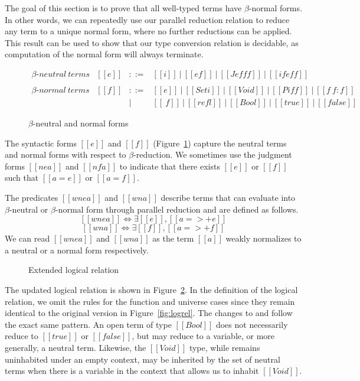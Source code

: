 \documentclass[acmsmall,screen=true,
\ifpublic review=false\else,review=true\fi
  ,anonymous=\ifanonymous true\else false\fi]{acmart}
\begin{document}
The goal of this section is to prove that all well-typed terms have
$\beta$-normal forms. In other words, we can repeatedly use our parallel
reduction relation to reduce any term to a unique normal form, where no
further reductions can be applied. This result can be used to show that our
type conversion relation is decidable, as computation of the normal form will
always terminate.

\begin{figure}[h]
  \[
    \begin{array}{llcl}
       \beta\text{-}\mathit{neutral\ terms} &
      [[e]] & ::= & [[i]]\ |\ [[e f]]\ |\ [[J e f f f]]\ |\ [[if e f
                    f]] \\ \\
      \beta\text{-}\mathit{normal\ terms} &
      [[f]] & ::= & [[e]]\ |\ [[Set i]]\ |\ [[Void]]\ |\ [[Pi f f]]\
                    |\ [[f ~ f : f]]\\
            & & |   & [[\ f]]\ |\ [[refl]]\ |\ [[Bool]]\ |\ [[true]]\ |\ [[false]]
    \end{array}
  \]
  \caption{$\beta$-neutral and normal forms}
  \label{fig:nenf}
\end{figure}

The syntactic forms $[[e]]$ and $[[f]]$ (Figure~\ref{fig:nenf}) capture the
neutral terms and normal forms with respect to $\beta$-reduction. We sometimes
use the judgment forms $[[ne a]]$ and $[[nf a]]$ to indicate that there exists
$[[e]]$ or $[[f]]$ such that $[[a = e]]$ or $[[a = f]]$.

The predicates $[[wne a]]$ and $[[wn
a]]$ describe terms that can evaluate into $\beta$-neutral or
$\beta$-normal form through parallel reduction and are defined as
follows.
\[ [[wne a]] \iff \exists [[e]], [[a =>+ e]] \]
\[ [[wn a]] \iff \exists [[f]], [[a =>+ f]] \]
We can read $[[wne a]]$ and $[[wn a]]$ as the term $[[a]]$ weakly normalizes to a neutral or a normal form respectively.

\begin{figure}[h]
  \caption{Extended logical relation}
  \label{fig:logrelopen}
\end{figure}

The updated logical relation is shown
in Figure~\ref{fig:logrelopen}.
In the definition of the logical relation, we omit the rules for
the function and universe cases since they remain identical to the
original version in Figure~\ref{fig:logrel}.
The changes to  and  follow the exact same pattern.
An open term of type $[[Bool]]$ does
not necessarily reduce to $[[true]]$ or $[[false]]$, but may reduce to
a variable, or more generally, a neutral term. Likewise, the
$[[Void]]$ type, while remains uninhabited under an empty context, may
be inherited by the set of neutral terms when there is a variable in
the context that allows us to inhabit $[[Void]]$.
\end{document}
